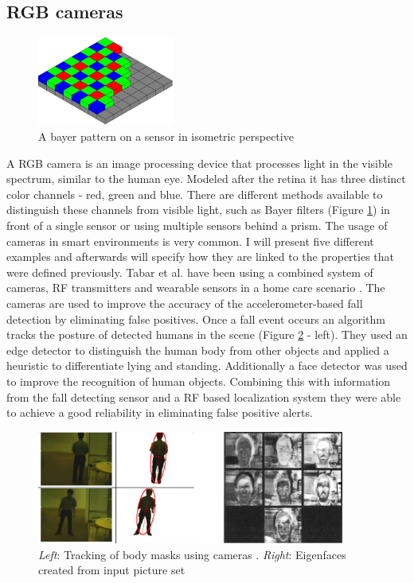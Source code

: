 \subsection{RGB cameras}
\begin{figure}[h]
\centering
\includegraphics[width=0.4\textwidth]{images/bayer_pattern_on_sensor}
\caption{A bayer pattern on a sensor in isometric perspective \cite{img_bayer_pattern}}
\label{fig:bayer_pattern}
\end{figure}
A RGB camera is an image processing device that processes light in the visible spectrum, similar to the human eye. Modeled after the retina it has three distinct color channels - red, green and blue. There are different methods available to distinguish these channels from visible light, such as Bayer filters (Figure \ref{fig:bayer_pattern}) in front of a single sensor or using multiple sensors behind a prism.
The usage of cameras in smart environments is very common. I will present five different examples and afterwards will specify how they are linked to the properties that were defined previously.
Tabar et al. have been using a combined system of cameras, RF transmitters and wearable sensors in a home care scenario \cite{tabar2006smart}. The cameras are used to improve the accuracy of the accelerometer-based fall detection by eliminating false positives. Once a fall event occurs an algorithm tracks the posture of detected humans in the scene (Figure \ref{fig:rel_tech_body_face} - left). They used an edge detector to distinguish the human body from other objects and applied a heuristic to differentiate lying and standing.  Additionally a face detector was used to improve the recognition of human objects. Combining this with information from the fall detecting sensor and a RF based localization system they were able to achieve a good reliability in eliminating false positive alerts.
\begin{figure}[h]
\centering
\includegraphics[width=0.9\textwidth]{images/rel_tech_body_face}
\caption{\emph{Left}: Tracking of body masks using cameras  \cite{tabar2006smart}. \emph{Right}: Eigenfaces created from input picture set \cite{pentland2000face}}
\label{fig:rel_tech_body_face}
\end{figure}

